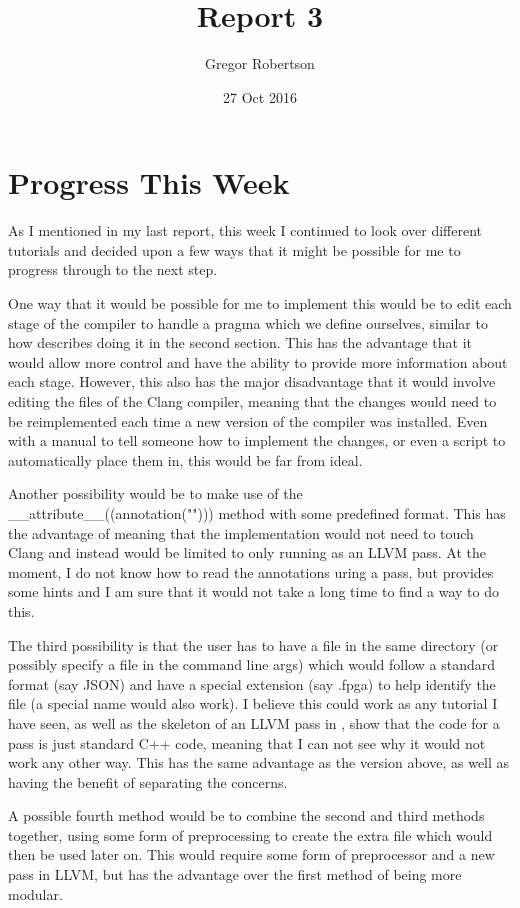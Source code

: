 \documentclass{article}
\title{Report 3}
\author{Gregor Robertson}
\date{27 Oct 2016}
\begin{document}
 
\maketitle
 
\section*{Progress This Week}
As I mentioned in my last report, this week I continued to look over different tutorials and decided upon a few ways that it might be possible for me to progress through to the next step.

One way that it would be possible for me to implement this would be to edit each stage of the compiler to handle a pragma which we define ourselves, similar to how \cite{ImplementingACustomDirectiveHandlerInClang} describes doing it in the second section. This has the advantage that it would allow more control and have the ability to provide more information about each stage. However, this also has the major disadvantage that it would involve editing the files of the Clang compiler, meaning that the changes would need to be reimplemented each time a new version of the compiler was installed. Even with a manual to tell someone how to implement the changes, or even a script to automatically place them in, this would be far from ideal.

Another possibility would be to make use of the \_\_attribute\_\_((annotation(""))) method with some predefined format. This has the advantage of meaning that the implementation would not need to touch Clang and instead would be limited to only running as an LLVM pass. At the moment, I do not know how to read the annotations uring a pass, but \cite{llvmGetAnnotations} provides some hints and I am sure that it would not take a long time to find a way to do this. 

The third possibility is that the user has to have a file in the same directory (or possibly specify a file in the command line args) which would follow a standard format (say JSON) and have a special extension (say .fpga) to help identify the file (a special name would also work). I believe this could work as any tutorial I have seen, as well as the skeleton of an LLVM pass in \cite{skeleton}, show that the code for a pass is just standard C++ code, meaning that I can not see why it would not work any other way. This has the same advantage as the version above, as well as having the benefit of separating the concerns. 

A possible fourth method would be to combine the second and third methods together, using some form of preprocessing to create the extra file which would then be used later on. This would require some form of preprocessor and a new pass in LLVM, but has the advantage over the first method of being more modular. 
\end{document}
